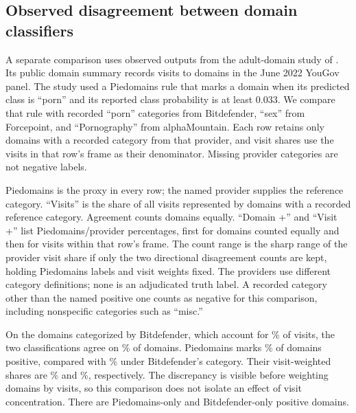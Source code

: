 \subsection{Observed disagreement between domain classifiers}\label{sec:adult}
A separate comparison uses observed outputs from the adult-domain study of
\citet{sood2024holier}. Its public domain summary records \AdultVisits{} visits
to \AdultDomains{} domains in the June 2022 YouGov panel. The study used a
Piedomains rule that marks a domain when its predicted class is ``porn'' and
its reported class probability is at least 0.033. We compare that rule with
recorded ``porn'' categories from Bitdefender, ``sex'' from Forcepoint, and
``Pornography'' from alphaMountain. Each row retains only domains with a
recorded category from that provider, and visit shares use the visits in that
row's frame as their denominator. Missing provider categories are not negative
labels.

\begin{table}[htbp]
\centering\small
\setlength{\tabcolsep}{3.5pt}
\caption{Observed classifier disagreement and visit-weighted shares}
\label{tab:adult}

\par\smallskip
\begin{minipage}{\linewidth}\footnotesize
Piedomains is the proxy in every row; the named provider supplies the reference
category. ``Visits'' is the share of all \AdultVisits{} visits represented by
domains with a recorded reference category. Agreement counts domains equally.
``Domain +'' and ``Visit +'' list Piedomains/provider percentages, first for
domains counted equally and then for visits within that row's frame. The
count range is the sharp range of the provider visit share if only the two
directional disagreement counts are kept, holding Piedomains labels and visit
weights fixed. The providers use
different category definitions; none is an adjudicated truth label.
A recorded category other than the named positive one counts as negative for
this comparison, including nonspecific categories such as ``misc.''
\end{minipage}
\end{table}
\FloatBarrier

On the \AdultFocalDomains{} domains categorized by Bitdefender, which account
for \AdultFocalCoverage{}\% of visits, the two classifications agree on
\AdultFocalAgreement{}\% of domains. Piedomains marks
\AdultFocalProxyDomains{}\% of domains positive, compared with
\AdultFocalReferenceDomains{}\% under Bitdefender's category. Their
visit-weighted shares are \AdultFocalProxy{}\% and
\AdultFocalReference{}\%, respectively. The discrepancy is visible before
weighting domains by visits, so this comparison does not isolate an effect of
visit concentration. There are \AdultFocalProxyOnly{} Piedomains-only and
\AdultFocalReferenceOnly{} Bitdefender-only positive domains.

